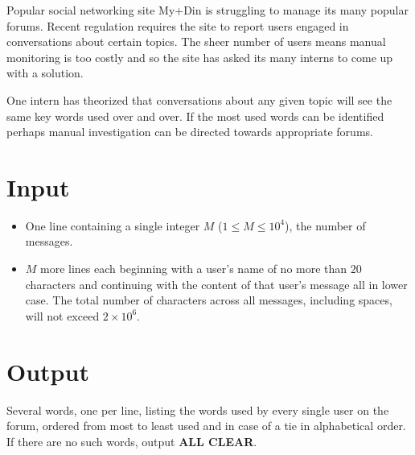 
Popular social networking site My+Din is struggling to manage its many
popular forums. Recent regulation requires the site to report users engaged in
conversations about certain topics. The sheer number of users means manual
monitoring is too costly and so the site has asked its many interns to come up
with a solution.

One intern has theorized that conversations about any given topic will see the
same key words used over and over. If the most used words can be identified
perhaps manual investigation can be directed towards appropriate forums.

\section*{Input}

\begin{itemize}

\item One line containing a single integer $M$ ($1 \le M \le 10^4$), the number
of messages.

\item $M$ more lines each beginning with a user's name of no more than $20$
characters and continuing with the content of that user's message all in lower
case. The total number of characters across all messages, including spaces,
will not exceed $2 \times 10^6$.

\end{itemize}

\section*{Output}

Several words, one per line, listing the words used by every single user on the
forum, ordered from most to least used and in case of a tie in alphabetical
order. If there are no such words, output \textbf{ALL CLEAR}.
